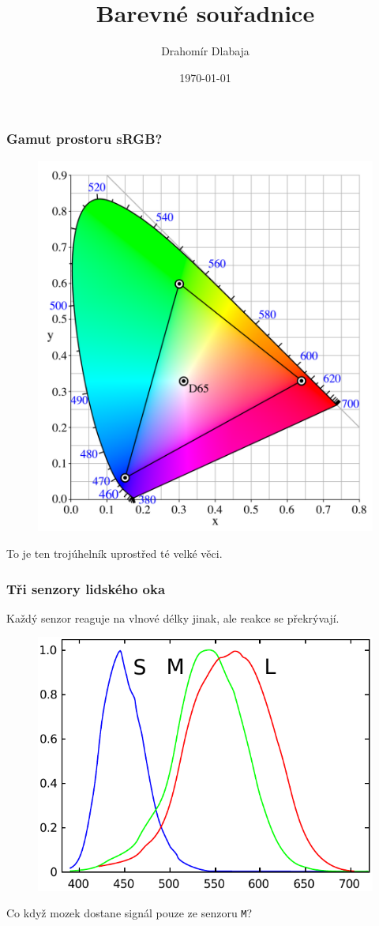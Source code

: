 \documentclass{beamer}
\title{Barevné souřadnice}
\author{Drahomír Dlabaja}
\institute[xdlaba02]{Vysoké učení technické v Brně}
\date{\today}
\begin{document}
\begin{frame}
  \titlepage
\end{frame}

\begin{frame}
  \center
  \frametitle{Gamut prostoru sRGB?}
  \begin{figure}
    \includegraphics[height=0.7\textheight]{CIExy1931_sRGB.png}
  \end{figure}
  To je ten trojúhelník uprostřed té velké věci.
\end{frame}

\begin{frame}
  \center
  \frametitle{Tři senzory lidského oka}
  Každý senzor reaguje na vlnové délky jinak, ale reakce se překrývají.
  \begin{figure}
    \includegraphics[height=0.6\textheight]{Cones_SMJ2_E.pdf}
  \end{figure}
  Co když mozek dostane signál pouze ze senzoru \texttt{M}?
\end{frame}
\end{document}
